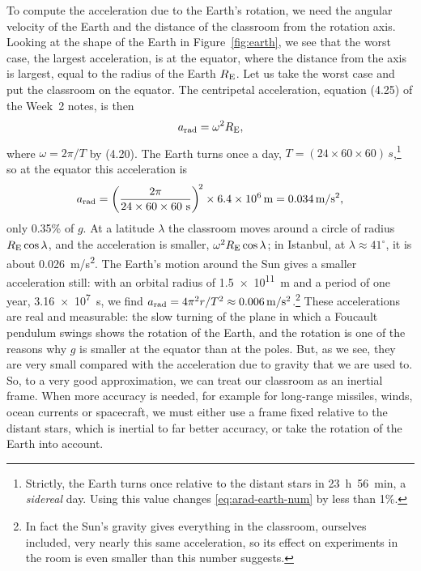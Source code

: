 \documentclass[11pt,a4paper]{article}
\begin{document}
To compute the acceleration due to the Earth's rotation, we need the angular velocity of the Earth
and the distance of the classroom from the rotation axis. Looking at the shape of the Earth in
Figure~\ref{fig:earth}, we see that the worst case, the largest acceleration, is at the equator,
where the distance from the axis is largest, equal to the radius of the Earth $R_{\mathrm{E}}$. Let us
take the worst case and put the classroom on the equator. The centripetal acceleration, equation
(4.25) of the Week~2 notes, is then
\begin{equation}\label{eq:arad-earth}
  a_{\mathrm{rad}} = \omega^2 R_{\mathrm{E}} ,
\end{equation}
where $\omega = 2\pi/T$ by (4.20). The Earth turns once a day, $T = (24\times 60\times
60)\,\unit{s}$,\footnote{Strictly, the Earth turns once relative to the distant stars in
\qty{23}{h}~\qty{56}{min}, a \emph{sidereal} day. Using this value changes \eqref{eq:arad-earth-num}
by less than 1\%.} so at the equator this acceleration is
\begin{equation}\label{eq:arad-earth-num}
  a\sub{rad} = \left(\frac{2\pi}{24\times 60\times 60\ \unit{s}}\right)^{\!2} \times
  \qty{6.4e6}{m} = \qty{0.034}{m/s^2} ,
\end{equation}
only 0.35\% of $g$. At a latitude $\lambda$ the classroom moves around a circle of radius
$R_{\mathrm{E}}\cos\lambda$, and the acceleration is smaller, $\omega^2R_{\mathrm{E}}\cos\lambda$; in Istanbul,
at $\lambda \approx 41^\circ$, it is about \qty{0.026}{m/s^2}. The Earth's motion around the Sun
gives a smaller acceleration still: with an orbital radius of \qty{1.5e11}{m} and a period of one
year, \qty{3.16e7}{s}, we find $a_{\mathrm{rad}} = 4\pi^2 r/T^2 \approx \qty{0.006}{m/s^2}$.\footnote{In
fact the Sun's gravity gives everything in the classroom, ourselves included, very nearly this same
acceleration, so its effect on experiments in the room is even smaller than this number suggests.}
These accelerations are real and measurable: the slow turning of the plane in which a Foucault
pendulum swings shows the rotation of the Earth, and the rotation is one of the reasons why $g$ is
smaller at the equator than at the poles. But, as we see, they are very small compared with the
acceleration due to gravity that we are used to. So, to a very good approximation, we can treat our
classroom as an inertial frame. When more accuracy is needed, for example for long-range missiles,
winds, ocean currents or spacecraft, we must either use a frame fixed relative to the distant
stars, which is inertial to far better accuracy, or take the rotation of the Earth into account.
\end{document}
